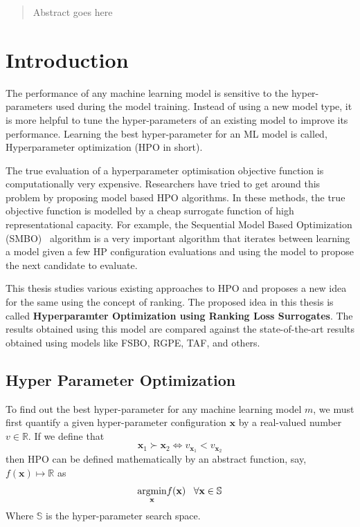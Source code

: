 \documentclass[12pt, twoside, ngerman]{report}
\begin{document}
\newpage
{}
\begin{abstract}

Abstract goes here

\end{abstract}

\newpage

\tableofcontents
\newpage
\newpage


\chapter{Introduction}

The performance of any machine learning model is sensitive to the hyper-parameters used during the model training. 
Instead of using a new model type, it is more helpful to tune the hyper-parameters of an existing model to improve its performance.
Learning the best hyper-parameter for an ML model is called, Hyperparameter optimization (HPO in short).

The true evaluation of a hyperparameter optimisation objective function is computationally very expensive. 
Researchers have tried to get around this problem by proposing model based HPO algorithms.
In these methods,  the true objective function is modelled by a cheap surrogate function of high representational capacity.
For example,  the Sequential Model Based Optimization (SMBO)~\cite{NIPS2011_86e8f7ab} algorithm is a very important algorithm that iterates between learning a model given a few HP configuration evaluations and using the model to propose the next candidate to evaluate.

This thesis studies various existing approaches to HPO and proposes a new idea for the same using the concept of ranking.
The proposed idea in this thesis is called \textbf{Hyperparamter Optimization using Ranking Loss Surrogates}. 
The results obtained using this model are compared against the state-of-the-art results obtained using models like FSBO,  RGPE,  TAF, and others. 

\section{Hyper Parameter Optimization}
\label{sec:HPODefinition}
To find out the best hyper-parameter for any machine learning model $m$, we must first quantify a given hyper-parameter configuration $\textbf{x}$ by a real-valued number $v \in \mathbb{R}$.
If we define that
$$
\textbf{x}_1 \succ  \textbf{x}_2 \iff v_{\textbf{x}_1} < v_{\textbf{x}_2}
$$
then HPO can be defined mathematically by an abstract function, say,  $f(\textbf{x}) \mapsto \mathbb{R}$ as
$$
     \underset{\rm \textbf{x}}{\rm argmin}  f(\textbf{x}) \;\;\;  \forall \textbf{x} \in \mathbb{S}
$$
Where $\mathbb{S}$ is the hyper-parameter search space.
\end{document}
